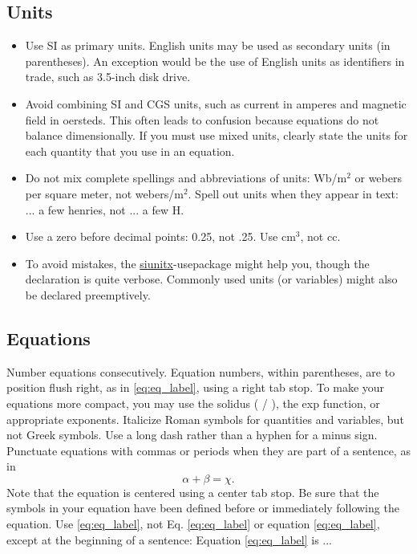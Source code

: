 \documentclass[11pt]{report}
\numberwithin{equation}{chapter}		%
\numberwithin{figure}{chapter}			%
\numberwithin{table}{chapter}			%
\begin{document}
	\subsection{Units}

	\begin{itemize}
	\item Use SI as primary units. English units may be used as secondary units (in parentheses). An exception would be the use of English units as identifiers in trade, such as 3.5-inch disk drive.
	\item Avoid combining SI and CGS units, such as current in amperes and magnetic field in oersteds. This often leads to confusion because equations do not balance dimensionally. If you must use mixed units, clearly state the units for each quantity that you use in an equation.
	\item Do not mix complete spellings and abbreviations of units: Wb/m$^2$ or webers per square meter, not webers/m$^2$.  Spell out units when they appear in text: ... a few henries, not ... a few H.
	\item Use a zero before decimal points: 0.25, not .25. Use cm$^3$, not cc. 
	\item To avoid mistakes, the \href{http://mirrors.ibiblio.org/CTAN/macros/latex/contrib/siunitx/siunitx.pdf}{siunitx}-usepackage might help you, though the declaration is quite verbose. Commonly used units (or variables) might also be declared preemptively. 
	\end{itemize}

	\subsection{Equations}
	Number equations consecutively. Equation numbers, within parentheses, are to position flush right, as in \eqref{eq:eq_label}, using a right tab stop. To make your equations more compact, you may use the solidus ( / ), the exp function, or appropriate exponents. Italicize Roman symbols for quantities and variables, but not Greek symbols. Use a long dash rather than a hyphen for a minus sign. Punctuate equations with commas or periods when they are part of a sentence, as in
	\begin{equation}\label{eq:eq_label}
	    \alpha + \beta = \chi.
	\end{equation}
	Note that the equation is centered using a center tab stop. Be sure that the symbols in your equation have been defined before or immediately following the equation. Use \eqref{eq:eq_label}, not Eq. \eqref{eq:eq_label} or equation \eqref{eq:eq_label}, except at the beginning of a sentence: Equation \eqref{eq:eq_label} is ...
\end{document}
